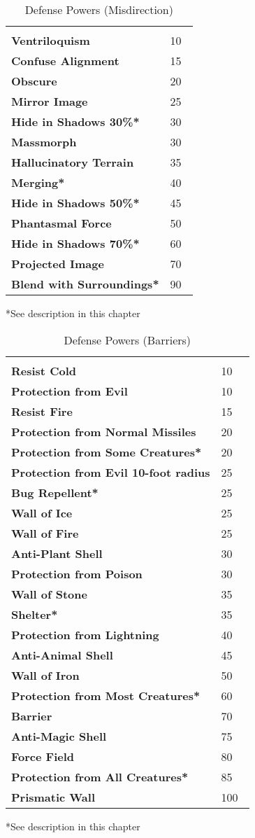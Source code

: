 \begin{multicols*}{2}
\begin {table}[H]
  \caption{Defense Powers (Misdirection)}
  \begin{tabularx}{\columnwidth}{>{\bfseries}YY}
   & \\
	Ventriloquism & 10\\
	Confuse Alignment & 15\\
	Obscure & 20\\
	Mirror Image & 25\\
	Hide in Shadows 30\%* & 30\\
	Massmorph & 30\\
	Hallucinatory Terrain & 35\\
	Merging* & 40\\
	Hide in Shadows 50\%* & 45\\
	Phantasmal Force & 50\\
	Hide in Shadows 70\%* & 60\\
	Projected Image & 70\\
	Blend with Surroundings* & 90\
  \end {tabularx}
	*See description in this chapter
\end {table}

\begin {table}[H]
  \caption{Defense Powers (Barriers)}
  \begin{tabularx}{\columnwidth}{>{\bfseries}YY}
   & \\
	Resist Cold & 10\\
	Protection from Evil & 10\\
	Resist Fire & 15\\
	Protection from Normal Missiles & 20\\
	Protection from Some Creatures* & 20\\
	Protection from Evil 10-foot radius & 25\\
	Bug Repellent* & 25\\
	Wall of Ice & 25\\
	Wall of Fire & 25\\
	Anti-Plant Shell & 30\\
	Protection from Poison & 30\\
	Wall of Stone & 35\\
	Shelter* & 35\\
	Protection from Lightning & 40\\
	Anti-Animal Shell & 45\\
	Wall of Iron & 50\\
	Protection from Most Creatures* & 60\\
	Barrier & 70\\
	Anti-Magic Shell & 75\\
	Force Field & 80\\
	Protection from All Creatures* & 85\\
	Prismatic Wall & 100\
  \end {tabularx}
	*See description in this chapter
\end {table}


\end{multicols*}
